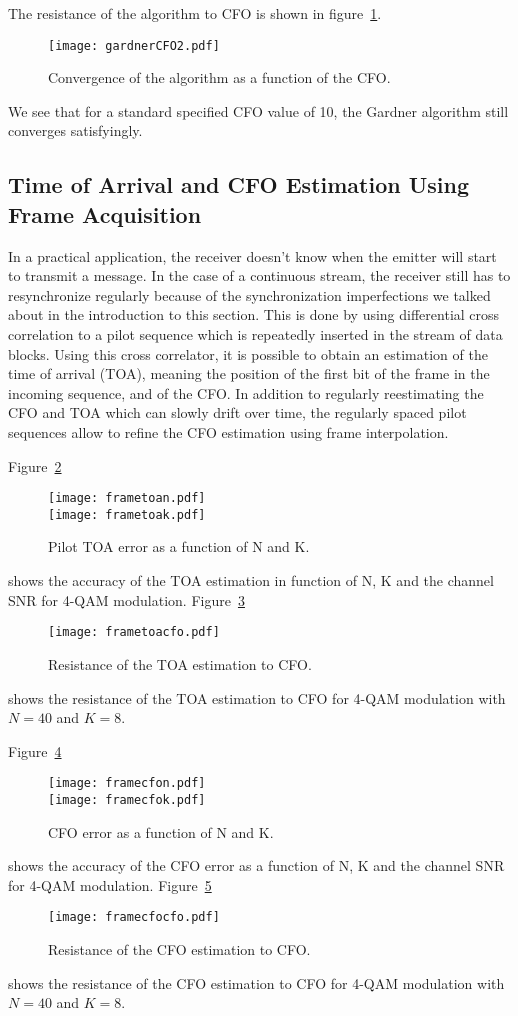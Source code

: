 The resistance of the algorithm to CFO is shown in figure~\ref{fig:gConvCFO}.
\begin{figure}[htbp]
    \centering
    \texttt{[image: gardnerCFO2.pdf]}
    \caption{Convergence of the algorithm as a function of the CFO.\label{fig:gConvCFO}}
\end{figure}
We see that for a standard specified CFO value of \SI{10}{\ppm}, the Gardner algorithm still converges satisfyingly.

\subsection{Time of Arrival and CFO Estimation Using Frame Acquisition}
In a practical application, the receiver doesn't know when the emitter will start to transmit a message.
In the case of a continuous stream, the receiver still has to resynchronize regularly because of the synchronization imperfections we talked about in the introduction to this section.
This is done by using differential cross correlation to a pilot sequence which is repeatedly inserted in the stream of data blocks.
Using this cross correlator, it is possible to obtain an estimation of the time of arrival (TOA), meaning the position of the first bit of the frame in the incoming sequence, and of the CFO.
In addition to regularly reestimating the CFO and TOA which can slowly drift over time, the regularly spaced pilot sequences allow to refine the CFO estimation using frame interpolation.

Figure~\ref{fig:frametoa}
\begin{figure}
  \centering
  \texttt{[image: frametoan.pdf]}
  \\\texttt{[image: frametoak.pdf]}
  \caption{Pilot TOA error as a function of N and K.\label{fig:frametoa}}
\end{figure}
shows the accuracy of the TOA estimation in function of N, K and the channel SNR for 4-QAM modulation.
Figure~\ref{fig:frametoacfo}
\begin{figure}
  \centering
  \texttt{[image: frametoacfo.pdf]}
  \caption{Resistance of the TOA estimation to CFO.\label{fig:frametoacfo}}
\end{figure}
shows the resistance of the TOA estimation to CFO for 4-QAM modulation with $N = 40$ and $K=8$.

Figure~\ref{fig:framecfo}
\begin{figure}
  \centering
  \texttt{[image: framecfon.pdf]}
  \\\texttt{[image: framecfok.pdf]}
  \caption{CFO error as a function of N and K.\label{fig:framecfo}}
\end{figure}
shows the accuracy of the CFO error as a function of N, K and the channel SNR for 4-QAM modulation.
Figure~\ref{fig:framecfocfo}
\begin{figure}
  \centering
  \texttt{[image: framecfocfo.pdf]}
  \caption{Resistance of the CFO estimation to CFO.\label{fig:framecfocfo}}
\end{figure}
shows the resistance of the CFO estimation to CFO for 4-QAM modulation with $N = 40$ and $K=8$.

